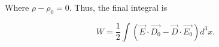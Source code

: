 \documentclass[11pt]{article}
\begin{document}
Where $\rho - \rho_{0} = 0$. Thus, the final integral is 

$$
W = \frac{1}{2} \int (\vec{E} \cdot \vec{D_{0}} - \vec{D} \cdot \vec{E_{0}}) d^{3}x.
$$

\clearpage


%



\end{document}
